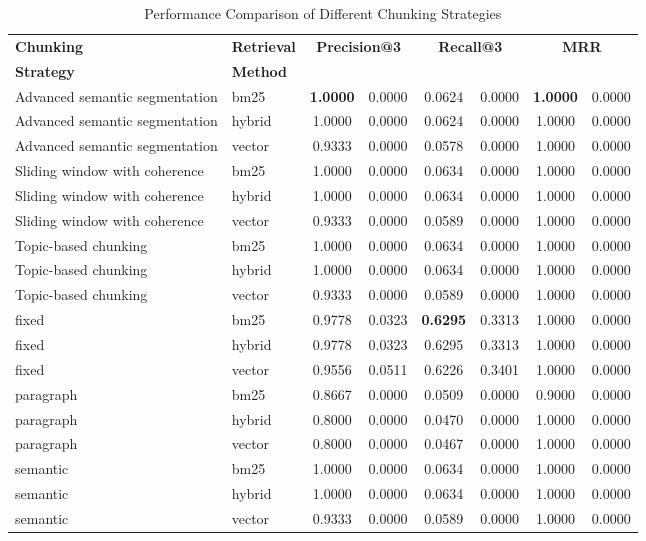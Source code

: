 \begin{table}[htbp]
\caption{Performance Comparison of Different Chunking Strategies}
\begin{center}
\begin{tabular}{|l|l|c@{$\pm$}c|c@{$\pm$}c|c@{$\pm$}c|}
\hline
\textbf{Chunking} & \textbf{Retrieval} & \multicolumn{2}{c|}{\textbf{Precision@3}} & \multicolumn{2}{c|}{\textbf{Recall@3}} & \multicolumn{2}{c|}{\textbf{MRR}} \\ 
\textbf{Strategy} & \textbf{Method} & \multicolumn{2}{c|}{} & \multicolumn{2}{c|}{} & \multicolumn{2}{c|}{} \\ 
\hline
Advanced semantic segmentation & bm25 & \textbf{1.0000} & 0.0000 & 0.0624 & 0.0000 & \textbf{1.0000} & 0.0000 \\ 
Advanced semantic segmentation & hybrid & 1.0000 & 0.0000 & 0.0624 & 0.0000 & 1.0000 & 0.0000 \\ 
Advanced semantic segmentation & vector & 0.9333 & 0.0000 & 0.0578 & 0.0000 & 1.0000 & 0.0000 \\ 
Sliding window with coherence & bm25 & 1.0000 & 0.0000 & 0.0634 & 0.0000 & 1.0000 & 0.0000 \\ 
Sliding window with coherence & hybrid & 1.0000 & 0.0000 & 0.0634 & 0.0000 & 1.0000 & 0.0000 \\ 
Sliding window with coherence & vector & 0.9333 & 0.0000 & 0.0589 & 0.0000 & 1.0000 & 0.0000 \\ 
Topic-based chunking & bm25 & 1.0000 & 0.0000 & 0.0634 & 0.0000 & 1.0000 & 0.0000 \\ 
Topic-based chunking & hybrid & 1.0000 & 0.0000 & 0.0634 & 0.0000 & 1.0000 & 0.0000 \\ 
Topic-based chunking & vector & 0.9333 & 0.0000 & 0.0589 & 0.0000 & 1.0000 & 0.0000 \\ 
fixed & bm25 & 0.9778 & 0.0323 & \textbf{0.6295} & 0.3313 & 1.0000 & 0.0000 \\ 
fixed & hybrid & 0.9778 & 0.0323 & 0.6295 & 0.3313 & 1.0000 & 0.0000 \\ 
fixed & vector & 0.9556 & 0.0511 & 0.6226 & 0.3401 & 1.0000 & 0.0000 \\ 
paragraph & bm25 & 0.8667 & 0.0000 & 0.0509 & 0.0000 & 0.9000 & 0.0000 \\ 
paragraph & hybrid & 0.8000 & 0.0000 & 0.0470 & 0.0000 & 1.0000 & 0.0000 \\ 
paragraph & vector & 0.8000 & 0.0000 & 0.0467 & 0.0000 & 1.0000 & 0.0000 \\ 
semantic & bm25 & 1.0000 & 0.0000 & 0.0634 & 0.0000 & 1.0000 & 0.0000 \\ 
semantic & hybrid & 1.0000 & 0.0000 & 0.0634 & 0.0000 & 1.0000 & 0.0000 \\ 
semantic & vector & 0.9333 & 0.0000 & 0.0589 & 0.0000 & 1.0000 & 0.0000 \\ 
\hline
\end{tabular}
\label{tab:chunking}
\end{center}
\end{table}
